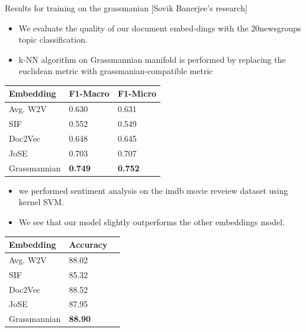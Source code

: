 \documentclass[8pt]{beamer}
\begin{document}
\begin{frame}{Results for training on the grassmanian [Sovik Banerjee's research]}

\begin{itemize}
\item We evaluate the quality of our document embed-dings with the 20newsgroups topic classification.
\item k-NN algorithm on Grassmannian manifold is performed by replacing
  the euclidean metric with grassmanian-compatible metric
\end{itemize}

\begin{tabular}{lll} \hline
Embedding & F1-Macro & F1-Micro\\ \hline
Avg. W2V & 0.630 & 0.631\\ \hline
SIF & 0.552 & 0.549 \\ \hline
Doc2Vec & 0.648 & 0.645 \\ \hline
JoSE & 0.703 & 0.707 \\ \hline
Grassmannian & \textbf{0.749} & \textbf{0.752}\\
\hline
\end{tabular}

\begin{itemize}
  \item we performed sentiment analysis on the imdb movie reveiew dataset using kernel SVM.
  \item We see that our model slightly outperforms the other embeddings model.
\end{itemize}

\begin{tabular}{lll} \hline
Embedding & Accuracy\\ \hline
Avg. W2V & 88.02\\ \hline
SIF & 85.32 \\ \hline
Doc2Vec & 88.52 \\ \hline
JoSE &  87.95\\ \hline
Grassmannian & \textbf{88.90}\\
\hline
\end{tabular}

\end{frame}
\end{document}
